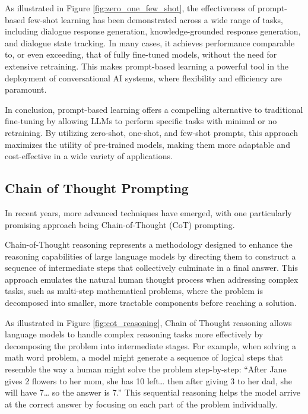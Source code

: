 As illustrated in Figure \ref{fig:zero_one_few_shot}, the effectiveness of prompt-based few-shot learning has been demonstrated across a wide range of tasks, including dialogue response generation, knowledge-grounded response generation, and dialogue state tracking. In many cases, it achieves performance comparable to, or even exceeding, that of fully fine-tuned models, without the need for extensive retraining. This makes prompt-based learning a powerful tool in the deployment of conversational AI systems, where flexibility and efficiency are paramount.

In conclusion, prompt-based learning offers a compelling alternative to traditional fine-tuning by allowing LLMs to perform specific tasks with minimal or no retraining. By utilizing zero-shot, one-shot, and few-shot prompts, this approach maximizes the utility of pre-trained models, making them more adaptable and cost-effective in a wide variety of applications.

\subsection{Chain of Thought Prompting}

In recent years, more advanced techniques have emerged, with one particularly promising approach being Chain-of-Thought (CoT) prompting.

Chain-of-Thought reasoning represents a methodology designed to enhance the reasoning capabilities of large language models by directing them to construct a sequence of intermediate steps that collectively culminate in a final answer. This approach emulates the natural human thought process when addressing complex tasks, such as multi-step mathematical problems, where the problem is decomposed into smaller, more tractable components before reaching a solution.

As illustrated in Figure \ref{fig:cot_reasoning}, Chain of Thought reasoning allows language models to handle complex reasoning tasks more effectively by decomposing the problem into intermediate stages. For example, when solving a math word problem, a model might generate a sequence of logical steps that resemble the way a human might solve the problem step-by-step: “After Jane gives 2 flowers to her mom, she has 10 left… then after giving 3 to her dad, she will have 7… so the answer is 7.” This sequential reasoning helps the model arrive at the correct answer by focusing on each part of the problem individually.

